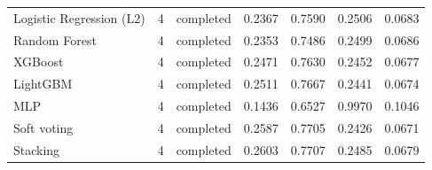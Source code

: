 \begin{table}[htbp]
\begin{tabular}{lrrrrrr}
Logistic Regression (L2) & 4 & completed & 0.2367 & 0.7590 & 0.2506 & 0.0683 \\
Random Forest & 4 & completed & 0.2353 & 0.7486 & 0.2499 & 0.0686 \\
XGBoost & 4 & completed & 0.2471 & 0.7630 & 0.2452 & 0.0677 \\
LightGBM & 4 & completed & 0.2511 & 0.7667 & 0.2441 & 0.0674 \\
MLP & 4 & completed & 0.1436 & 0.6527 & 0.9970 & 0.1046 \\
Soft voting & 4 & completed & 0.2587 & 0.7705 & 0.2426 & 0.0671 \\
Stacking & 4 & completed & 0.2603 & 0.7707 & 0.2485 & 0.0679 \\
\bottomrule
\end{tabular}
\end{table}

